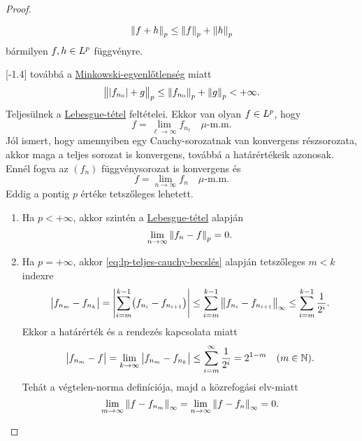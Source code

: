\documentclass[
]{elteikthesis}[2024/04/26]
\begin{document}
\begin{proof}
{			\begin{theo*}\label{th:minkowski}
				\[
					\norm{ f + h }_p \leq \norm{ f }_p + \norm{ h }_p
				\]
				bármilyen \( f, h \in \Lebesgue[p] \) függvényre.
			\end{theo*}
		}[-1.4\baselineskip]
		továbbá a \hyperref[th:minkowski]{Minkowski-egyenlőtlenség} miatt
		\[
			\norm\big{ \abs{ f_{n_0} } + g }_p \leq 
			\norm{ f_{n_0} }_p + \norm{g}_p < +\infty.
		\]
		Teljesülnek a \hyperref[th:lebesgue]{Lebesgue-tétel} feltételei.
		Ekkor van olyan	\( f \in \Lebesgue[p] \), hogy
		\[
			f = \lim_{\ell \to \infty} f_{n_\ell} \quad \mu \text{-m.m.}
		\]
		Jól ismert, hogy amennyiben egy Cauchy-sorozatnak van konvergens részsorozata, 
		akkor maga a teljes sorozat is konvergens, továbbá a határértékeik azonosak.
		Ennél fogva az \( (f_n) \) függvénysorozat is konvergens és
		\[
			f = \lim_{n \to \infty} f_n \quad \mu \text{-m.m.}
		\]
		Eddig a pontig \( p \) értéke tetszőleges lehetett.
		
		
		\begin{enumerate}
			\item Ha \( p < +\infty \), 
			akkor szintén a \hyperref[th:lebesgue]{Lebesgue-tétel} alapján
			\[
				\lim_{n \to \infty} \norm{ f_n - f}_p = 0.
			\]
			
			\item Ha \( p = +\infty \),
			akkor \eqref{eq:lp-teljes-cauchy-becslés} alapján tetszőleges \( m < k \) indexre
			\[
				\abs\big{ f_{n_m} - f_{n_k} } =
				\abs{ \sum_{i=m}^{k - 1} \bigl( f_{n_i} - f_{n_{i + 1}} \bigr) } \leq
				\sum_{i=m}^{k - 1} \norm\big{ f_{n_i} - f_{n_{i + 1}} }_\infty \leq
				\sum_{i=m}^{k - 1} \frac{1}{2^i}.
			\]
			Ekkor a határérték és a rendezés kapcsolata miatt
			\[
				\abs\big{ f_{n_m} - f } =
				\lim_{k \to \infty} \abs\big{ f_{n_m} - f_{n_k} } \leq
				\sum_{i=m}^{\infty} \frac{1}{2^i} =
				2^{1-m}
				\quad (m \in \mathbb{N}).
			\]
			Tehát a végtelen-norma definíciója, majd a közrefogási elv-miatt
			\[
				\lim_{m \to \infty} \norm{ f - f_{n_m} }_\infty =
				\lim_{n \to \infty} \norm{ f - f_n }_\infty =
				0.
			\]
		\end{enumerate}
		
	\end{proof}
	
\end{document}
